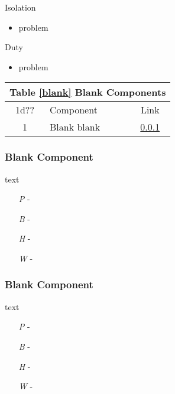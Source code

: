 \documentclass[a4paper]{article}
\begin{document}
\begin{minipage}[t]{0.4\linewidth}
Isolation
\begin{itemize}
\item problem
\end{itemize}
\end{minipage}
\begin{minipage}[t]{0.4\linewidth}
Duty
\begin{itemize}
\item problem
\end{itemize}
\end{minipage}

\vspace{0.5cm} \hspace{0.25\linewidth}
\begin{tabular}{@{} | c | l | c | @{}}
\toprule
\multicolumn{3}{|l|}{Table \ref{blank} Blank Components} \\
\toprule
1d?? & Component & Link \\
\midrule
1 & Blank blank & \ref{blank_blank} \\
\bottomrule
\end{tabular}

\hspace{-18pt} \subsubsection{Blank Component} \label{blank_blank} \vspace{-0.2cm}
text
\begin{enumerate}
\item [\textit{P}] - 
\item [\textit{B}] - 
\item [\textit{H}] - 
\item [\textit{W}] - 
\end{enumerate}

\vspace{-0.5cm} \hspace{-18pt} \subsubsection{Blank Component} \label{blank_blank2} \vspace{-0.2cm}
text
\begin{enumerate}
\item [\textit{P}] - 
\item [\textit{B}] - 
\item [\textit{H}] - 
\item [\textit{W}] - 
\end{enumerate}
\end{document}
